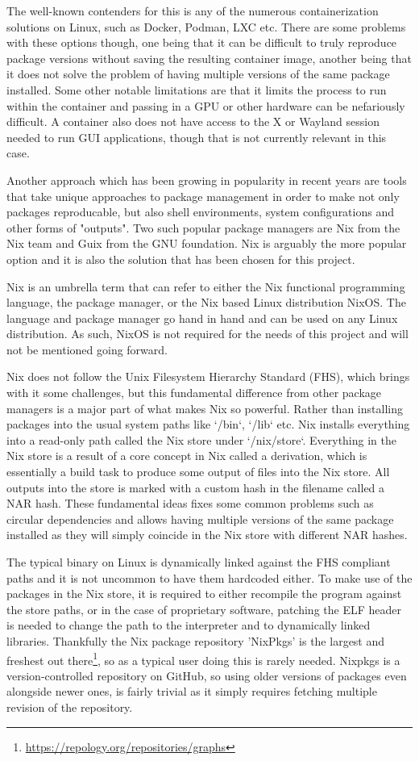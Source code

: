 The well-known contenders for this is any of the numerous containerization solutions on Linux, such as Docker, Podman, LXC etc. There are some problems with these options though, one being that it can be difficult to truly reproduce package versions without saving the resulting container image, another being that it does not solve the problem of having multiple versions of the same package installed. Some other notable limitations are that it limits the process to run within the container and passing in a GPU or other hardware can be nefariously difficult. A container also does not have access to the X or Wayland session needed to run GUI applications, though that is not currently relevant in this case.

Another approach which has been growing in popularity in recent years are tools that take unique approaches to package management in order to make not only packages reproducable, but also shell environments, system configurations and other forms of "outputs". Two such popular package managers are Nix from the Nix team and Guix from the GNU foundation. Nix is arguably the more popular option and it is also the solution that has been chosen for this project.

Nix is an umbrella term that can refer to either the Nix functional programming language, the package manager, or the Nix based Linux distribution NixOS. The language and package manager go hand in hand and can be used on any Linux distribution. As such, NixOS is not required for the needs of this project and will not be mentioned going forward.

Nix does not follow the Unix Filesystem Hierarchy Standard (FHS), which brings with it some challenges, but this fundamental difference from other package managers is a major part of what makes Nix so powerful.
Rather than installing packages into the usual system paths like `/bin`, `/lib` etc. Nix installs everything into a read-only path called the Nix store under `/nix/store`.
Everything in the Nix store is a result of a core concept in Nix called a derivation, which is essentially a build task to produce some output of files into the Nix store.
All outputs into the store is marked with a custom hash in the filename called a NAR hash. These fundamental ideas fixes some common problems such as circular dependencies and allows having multiple versions of the same package installed as they will simply coincide in the Nix store with different NAR hashes.

The typical binary on Linux is dynamically linked against the FHS compliant paths and it is not uncommon to have them hardcoded either. To make use of the packages in the Nix store, it is required to either recompile the program against the store paths, or in the case of proprietary software, patching the ELF header is needed to change the path to the interpreter and to dynamically linked libraries. Thankfully the Nix package repository 'NixPkgs' is the largest and freshest out there\footnote{\url{https://repology.org/repositories/graphs}}, so as a typical user doing this is rarely needed.
Nixpkgs is a version-controlled repository on GitHub, so using older versions of packages even alongside newer ones, is fairly trivial as it simply requires fetching multiple revision of the repository.

